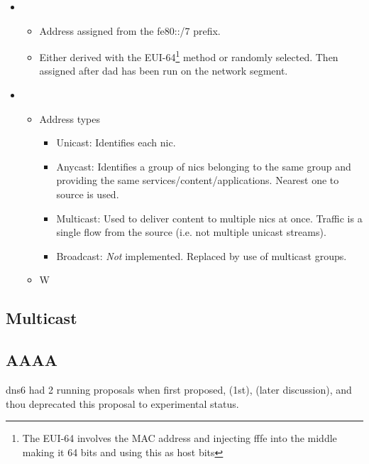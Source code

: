 \begin{itemize}
    \item {}
    \begin{itemize}
        \item Address assigned from the fe80::/7 prefix.
        \item Either derived with the EUI-64\footnote{The EUI-64 involves the MAC address and injecting fffe into the middle making it 64 bits and using this as host bits} method or randomly selected. Then assigned after \gls{dad} has been run on the network segment.
    \end{itemize}
    \item {}
    \begin{itemize}
        \item Address types
        \begin{itemize}
            \item Unicast: Identifies each \gls{nic}.
            \item Anycast: Identifies a group of \glspl{nic} belonging to the same group and providing the same services/content/applications. Nearest one to source is used.
            \item Multicast: Used to deliver content to multiple \glspl{nic} at once. Traffic is a single flow from the source (i.e. not multiple unicast streams).
            \item Broadcast: \textit{Not} implemented. Replaced by use of multicast groups.
        \end{itemize}
    \end{itemize}
    \begin{itemize}
        \item W
    \end{itemize}
\end{itemize}

\subsection{Multicast}

\subsection{AAAA}

\gls{dns6} had 2 running proposals when first proposed,  (1st),  (later discussion), and  thou deprecated this proposal to experimental status.

